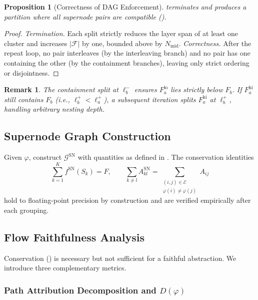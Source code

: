 \documentclass[11pt]{article}
\newtheorem{proposition}[theorem]{Proposition}
\newtheorem{remark}[theorem]{Remark}
\newcommand{\cG}{\mathcal{G}}
\newcommand{\cE}{\mathcal{E}}
\newcommand{\1}{\mathbbm{1}}
\newcommand{\Dphi}{D(\varphi)}
\begin{document}
\begin{proposition}[Correctness of DAG Enforcement]
\label{prop:dag-correctness}
   terminates and produces a partition where all supernode pairs are compatible ().
\end{proposition}

\begin{proof}
  \emph{Termination.} Each split strictly reduces the layer span of at least one cluster and increases $|\mathcal{F}|$ by one, bounded above by $N_{\mathrm{mid}}$.
  \emph{Correctness.} After the repeat loop, no pair interleaves (by the interleaving branch) and no pair has one containing the other (by the containment branches), leaving only strict ordering or disjointness.
\end{proof}

\begin{remark}
  The containment split at $\ell^-_b$ ensures $F_a^{\mathrm{lo}}$ lies strictly below $F_b$.
  If $F_a^{\mathrm{hi}}$ still contains $F_b$ (i.e., $\ell^+_b < \ell^+_a$), a subsequent iteration splits $F_a^{\mathrm{hi}}$ at $\ell^+_b$, handling arbitrary nesting depth.
\end{remark}

\subsection{Supernode Graph Construction}
\label{sec:sn-graph}

Given $\varphi$, construct $\cG^{\mathrm{SN}}$ with quantities as defined in .
The conservation identities
\begin{equation}
  \sum_{k=1}^K f^{\mathrm{SN}}(S_k) = F, \qquad
  \sum_{k \ne l} A^{\mathrm{SN}}_{kl} = \sum_{\substack{(i,j) \in \cE \\ \varphi(i) \ne \varphi(j)}} A_{ij}
  \label{eq:conservation}
\end{equation}
hold to floating-point precision by construction and are verified empirically after each grouping.

\subsection{Flow Faithfulness Analysis}
\label{sec:flow-analysis}

Conservation () is necessary but not sufficient for a faithful abstraction.
We introduce three complementary metrics.

\subsubsection{Path Attribution Decomposition and $\Dphi$}
\label{sec:path-decomp}
\end{document}
